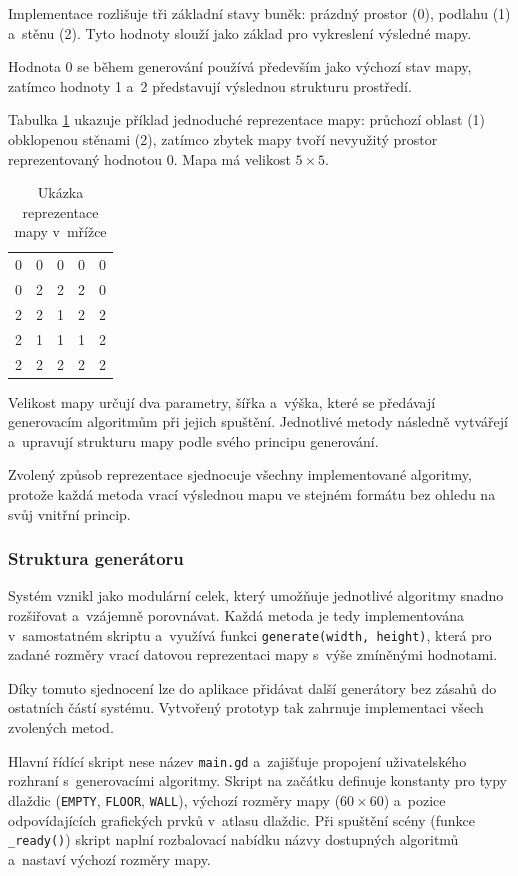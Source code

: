 \documentclass[
   program=itk,
   biblatex,
   figures=true,
   tables=true,
   glossaries,
   index
]{kidiplom}
\begin{document}
Implementace rozlišuje tři základní stavy buněk: prázdný prostor (0), podlahu (1) a~stěnu (2). Tyto hodnoty slouží jako základ pro vykreslení výsledné mapy.

Hodnota 0 se během generování používá především jako výchozí stav mapy, 
zatímco hodnoty 1 a~2 představují výslednou strukturu prostředí.

Tabulka \ref{tab:grid_example} ukazuje příklad jednoduché reprezentace mapy: průchozí oblast (1) obklopenou stěnami (2), zatímco zbytek mapy tvoří nevyužitý prostor reprezentovaný hodnotou 0. Mapa má velikost $5 \times 5$.

\begin{table}[h]
\centering
\begin{tabular}{ccccc}
0 & 0 & 0 & 0 & 0 \\
0 & 2 & 2 & 2 & 0 \\
2 & 2 & 1 & 2 & 2 \\
2 & 1 & 1 & 1 & 2 \\
2 & 2 & 2 & 2 & 2 \\
\end{tabular}
\caption{Ukázka reprezentace mapy v~mřížce}
\label{tab:grid_example}
\end{table}

Velikost mapy určují dva parametry, šířka a~výška, které se předávají generovacím algoritmům při jejich spuštění. Jednotlivé metody následně vytvářejí a~upravují strukturu mapy podle svého principu generování.

Zvolený způsob reprezentace sjednocuje všechny implementované algoritmy, protože každá metoda vrací výslednou mapu ve stejném formátu bez ohledu na svůj vnitřní princip.

\subsubsection{Struktura generátoru}

Systém vznikl jako modulární celek, který umožňuje jednotlivé algoritmy snadno rozšiřovat a~vzájemně porovnávat.
Každá metoda je tedy implementována v~samostatném skriptu a~využívá funkci \texttt{generate(width, height)}, která pro zadané rozměry vrací datovou reprezentaci mapy s~výše zmíněnými hodnotami.

Díky tomuto sjednocení lze do aplikace přidávat další generátory bez zásahů do ostatních částí systému. Vytvořený prototyp tak zahrnuje implementaci všech zvolených metod.

Hlavní řídící skript nese název \texttt{main.gd} a~zajišťuje propojení uživatelského rozhraní s~generovacími algoritmy. Skript na začátku definuje konstanty pro typy dlaždic (\texttt{EMPTY}, \texttt{FLOOR}, \texttt{WALL}), výchozí rozměry mapy ($60 \times 60$) a~pozice odpovídajících grafických prvků v~atlasu dlaždic. Při spuštění scény (funkce \texttt{\_ready()}) skript naplní rozbalovací nabídku názvy dostupných algoritmů a~nastaví výchozí rozměry mapy.
\end{document}
